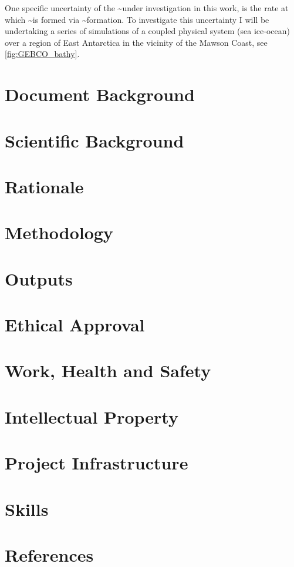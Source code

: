 \documentclass[a4paper]{article}
\begin{document}
One specific uncertainty of the \moc\textasciitilde{}under investigation in this
work, is the rate at which \aabw\textasciitilde{}is formed via \dsw\textasciitilde{}formation. To investigate
this uncertainty I will be undertaking a series of simulations of a coupled
physical system (sea ice-ocean) over a region of East Antarctica in the vicinity
of the Mawson Coast, see \ref{fig:GEBCO_bathy}.

\section{Document Background}
\label{sec:org00c7b36}

\section{Scientific Background}
\label{sec:orgdc8b54a}

\section{Rationale}
\label{sec:org8e29b4a}

\section{Methodology}
\label{sec:org1614ca1}

\section{Outputs}
\label{sec:orge4122e3}

\section{Ethical Approval}
\label{sec:org1efd92d}

\section{Work, Health and Safety}
\label{sec:org460f0fa}

\section{Intellectual Property}
\label{sec:org4e9acfe}

\section{Project Infrastructure}
\label{sec:orgbad9c0f}

\section{Skills}
\label{sec:org97d090f}

\section{References}
\label{sec:org30812a4}
\end{document}
